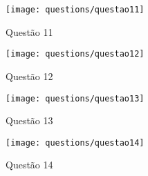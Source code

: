 \begin{apendicesenv}
\begin{figure}[H]
	\centering
	\texttt{[image: questions/questao11]}
	\caption[Questão 11]{Questão 11}
\end{figure}
\begin{figure}[H]
	\centering
	\texttt{[image: questions/questao12]}
	\caption[Questão 12]{Questão 12}
\end{figure}
\begin{figure}[H]
	\centering
	\texttt{[image: questions/questao13]}
	\caption[Questão 13]{Questão 13}
\end{figure}
\begin{figure}[H]
	\centering
	\texttt{[image: questions/questao14]}
	\caption[Questão 14]{Questão 14}
\end{figure}

\end{apendicesenv}
